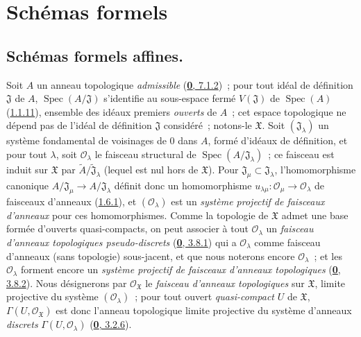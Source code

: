\section{Schémas formels}
\label{section:I.10-fr}

\subsection{Schémas formels affines.}
\label{subsection:I.10.1-fr}

\begin{env}[10.1.1]
\label{I.10.1.1-fr}
Soit $A$ un anneau topologique \emph{admissible}
(\hyperref[0.7.1.2-fr]{\textbf{0}, 7.1.2})~; pour tout idéal de définition
$\mathfrak{J}$ de $A$, $\operatorname{Spec}(A/\mathfrak{J})$ s'identifie
au sous-espace fermé $V(\mathfrak{J})$ de $\operatorname{Spec}(A)$
(\hyperref[I.1.1.11-fr]{1.1.11}), ensemble des idéaux premiers
\emph{ouverts} de $A$~; cet espace topologique ne dépend pas de
l'idéal de définition $\mathfrak{J}$ considéré~; notons-le
$\mathfrak{X}$. Soit $(\mathfrak{J}_\lambda)$ un système fondamental de
voisinages de 0 dans $A$, formé d'idéaux de définition, et pour tout
$\lambda$, soit $\mathscr{O}_\lambda$ le faisceau structural de
$\operatorname{Spec}(A/\mathfrak{J}_\lambda)$~; ce faisceau est induit sur
$\mathfrak{X}$ par
$\widetilde{A}/\widetilde{\mathfrak{J}}_\lambda$ (lequel est nul hors de
$\mathfrak{X}$).
Pour $\mathfrak{J}_\mu\subset\mathfrak{J}_\lambda$, l'homomorphisme
canonique $A/\mathfrak{J}_\mu\to A/\mathfrak{J}_\lambda$ définit donc un
homomorphisme
$u_{\lambda\mu}:\mathscr{O}_\mu\to\mathscr{O}_\lambda$ de faisceaux
d'anneaux (\hyperref[I.1.6.1-fr]{1.6.1}), et
$(\mathscr{O}_\lambda)$ est un \emph{système projectif de faisceaux
d'anneaux} pour ces homomorphismes. Comme la topologie de $\mathfrak{X}$
admet une base formée d'ouverts quasi-compacts, on peut associer à tout
$\mathscr{O}_\lambda$ un \emph{faisceau d'anneaux topologiques
pseudo-discrets} (\hyperref[0.3.8.1-fr]{\textbf{0}, 3.8.1}) qui a
$\mathscr{O}_\lambda$ comme faisceau d'anneaux (sans topologie) sous-jacent,
et que nous noterons encore $\mathscr{O}_\lambda$~; et les
$\mathscr{O}_\lambda$ forment encore un \emph{système projectif de faisceaux
d'anneaux topologiques} (\hyperref[0.3.8.2-fr]{\textbf{0}, 3.8.2}). Nous désignerons
par $\mathscr{O}_{\mathfrak{X}}$ le \emph{faisceau d'anneaux topologiques}
sur $\mathfrak{X}$, limite projective du système
$(\mathscr{O}_\lambda)$~; pour tout ouvert \emph{quasi-compact} $U$ de
$\mathfrak{X}$, $\Gamma(U,\mathscr{O}_{\mathfrak{X}})$ est donc l'anneau
topologique limite projective du système d'anneaux \emph{discrets}
$\Gamma(U,\mathscr{O}_\lambda)$
(\hyperref[0.3.2.6-fr]{\textbf{0}, 3.2.6}).
\end{env}

